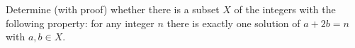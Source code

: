 Determine (with proof) whether there is a subset $X$ of the integers with the following property: for any integer $n$ there is exactly one solution of $a + 2b = n$ with $a,b \in X$.